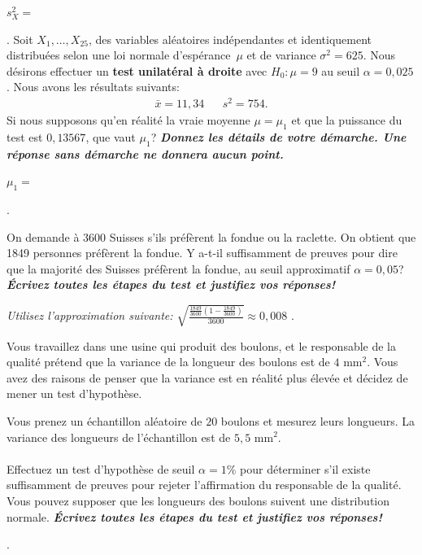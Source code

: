 \begin{questions}
\vspace{18cm}
$s^2_X=$ 

\newpage 
.
\newpage
\question[10] Soit $X_1,\hdots, X_{25}$, des variables aléatoires indépendantes et identiquement distribuées selon une loi normale d'espérance~$\mu$ et de variance $\sigma^2=625$.
Nous désirons effectuer un \textbf{test unilatéral à droite} avec $H_0:\mu=9$ au seuil $\alpha = 0,025$.
Nous avons les résultats suivants:
\begin{align*}
    \bar{x}= 11,34 &  & s^2=754.
\end{align*}
Si nous supposons qu'en réalité la vraie moyenne $\mu=\mu_1$ et que la puissance du test est $0,13567$, que vaut $\mu_1$? 
\textbf{\textit{Donnez les détails de votre démarche. Une réponse sans démarche ne donnera aucun point.}}

\vspace{18cm}
$\mu_1=$ 

\newpage 
.
\newpage


\question[10] On demande à 3600 Suisses s'ils préfèrent la fondue ou la raclette. On obtient que 1849 personnes préfèrent la fondue. Y a-t-il suffisamment de preuves pour dire que la majorité des Suisses préfèrent la fondue, au seuil approximatif $\alpha = 0,05$? \textbf{\textit{Écrivez toutes les étapes du test et justifiez vos réponses!}}

\textit{Utilisez l'approximation suivante: $\displaystyle\sqrt{\frac{\frac{1849}{3600}\left(1-\frac{1849}{3600}\right)}{3600}}\approx0,008$}
\newpage
.
\newpage

\question[10] Vous travaillez dans une usine qui produit des boulons, et le responsable de la qualité prétend que la variance de la longueur des boulons est de $4$ mm$^2$. Vous avez des raisons de penser que la variance est en réalité plus élevée et décidez de mener un test d'hypothèse.



Vous prenez un échantillon aléatoire de $20$ boulons et mesurez leurs longueurs. La variance des longueurs de l'échantillon est de $5,5$ mm$^2$. 
\\
\\
Effectuez un test d'hypothèse de seuil $\alpha=1\%$ pour déterminer s'il existe suffisamment de preuves pour rejeter l'affirmation du responsable de la qualité. Vous pouvez supposer que les longueurs des boulons suivent une distribution normale. \textbf{\textit{Écrivez toutes les étapes du test et justifiez vos réponses!}}



\end{questions}
\newpage
.
\newpage
 
